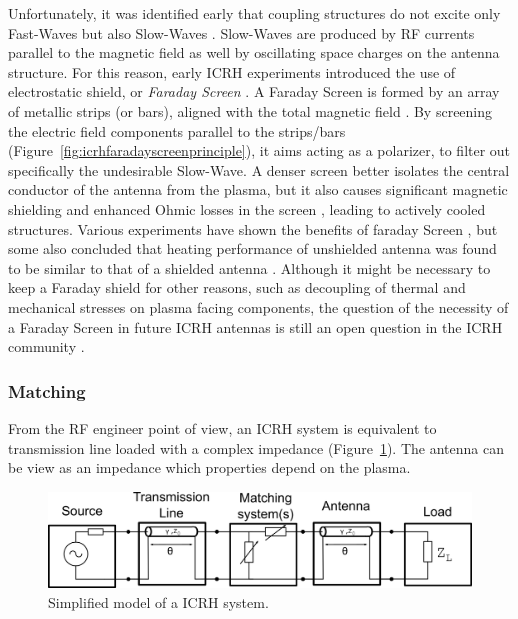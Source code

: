 Unfortunately, it was identified early that coupling structures do not excite only Fast-Waves but also Slow-Waves . Slow-Waves are produced by RF currents parallel to the magnetic field as well by oscillating space charges on the antenna structure. For this reason, early ICRH experiments introduced the use of electrostatic shield, or \textit{Faraday Screen} . A Faraday Screen is formed by an array of metallic strips (or bars), aligned with the total magnetic field . By screening the electric field components parallel to the strips/bars (Figure~\ref{fig:icrhfaradayscreenprinciple}), it aims acting as a polarizer, to filter out specifically the undesirable Slow-Wave. A denser screen better isolates the central conductor of the antenna from the plasma, but it also causes significant magnetic shielding and enhanced Ohmic losses in the screen , leading to actively cooled structures. Various experiments have shown the benefits of faraday Screen , but some also concluded that heating performance of unshielded antenna was found to be similar to that of a shielded antenna .  Although it might be necessary to keep a Faraday shield for other reasons, such as decoupling of thermal and mechanical stresses on plasma facing components, the question of the necessity of a Faraday Screen in future ICRH antennas is still an open question in the ICRH community . 



\subsubsection{Matching}\label{sec:ICRH_matching_systems}
From the RF engineer point of view, an ICRH system is equivalent to transmission line loaded with a complex impedance (Figure~\ref{fig:icrhantennacircuitmodel}). The antenna can be view as an impedance which properties depend on the plasma. 

\begin{figure}[h]
	\centering
	\includegraphics[width=0.9\linewidth]{figures/chap3/ICRH_antenna_circuit_model}
	\caption{Simplified model of a ICRH system.}
	\label{fig:icrhantennacircuitmodel}
\end{figure}

